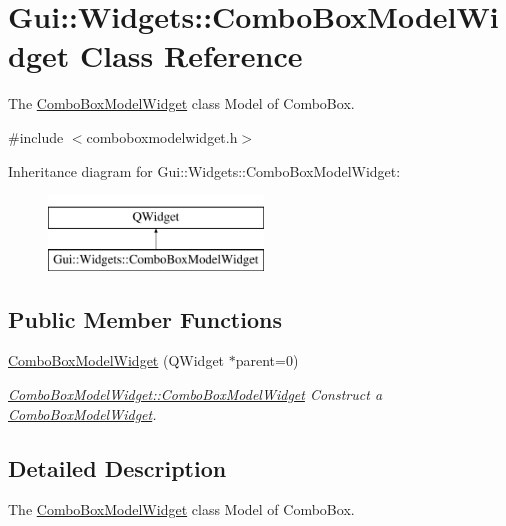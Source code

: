 \hypertarget{classGui_1_1Widgets_1_1ComboBoxModelWidget}{\section{Gui\-:\-:Widgets\-:\-:Combo\-Box\-Model\-Widget Class Reference}
\label{classGui_1_1Widgets_1_1ComboBoxModelWidget}
}


The \hyperlink{classGui_1_1Widgets_1_1ComboBoxModelWidget}{Combo\-Box\-Model\-Widget} class Model of Combo\-Box.  




{\ttfamily \#include $<$comboboxmodelwidget.\-h$>$}

Inheritance diagram for Gui\-:\-:Widgets\-:\-:Combo\-Box\-Model\-Widget\-:\begin{figure}[H]
\begin{center}
\leavevmode
\includegraphics[height=2.000000cm]{d2/de0/classGui_1_1Widgets_1_1ComboBoxModelWidget}
\end{center}
\end{figure}
\subsection*{Public Member Functions}
\begin{DoxyCompactItemize}
\item 
\hyperlink{classGui_1_1Widgets_1_1ComboBoxModelWidget_afeca0199adce7d17dc440e8fa546c9e5}{Combo\-Box\-Model\-Widget} (Q\-Widget $\ast$parent=0)
\begin{DoxyCompactList}\small\item\em \hyperlink{classGui_1_1Widgets_1_1ComboBoxModelWidget_afeca0199adce7d17dc440e8fa546c9e5}{Combo\-Box\-Model\-Widget\-::\-Combo\-Box\-Model\-Widget} Construct a \hyperlink{classGui_1_1Widgets_1_1ComboBoxModelWidget}{Combo\-Box\-Model\-Widget}. \end{DoxyCompactList}\end{DoxyCompactItemize}


\subsection{Detailed Description}
The \hyperlink{classGui_1_1Widgets_1_1ComboBoxModelWidget}{Combo\-Box\-Model\-Widget} class Model of Combo\-Box. 

